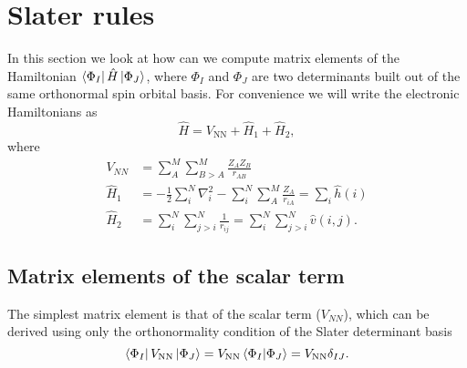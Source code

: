 \documentclass[../Main/chem532-notes.tex]{subfiles}
\begin{document}
\section{Slater rules}
In this section we look at how can we compute matrix elements of the Hamiltonian $\bra{\Phi_I} \hat{H} \ket{\Phi_J}$, where $\Phi_I$ and $\Phi_J$ are two determinants built out of the same orthonormal spin orbital basis. 
For convenience we will write the electronic Hamiltonians as
\begin{equation}
\hat{H} = V_\mathrm{NN} + \hat{H}_1 + \hat{H}_2,
\end{equation}
where
\begin{align}
V_{NN} &= \sum_{A}^{M} \sum_{B > A}^{M} \frac{Z_A Z_B}{r_{AB}}\\
\hat{H}_1 &= -\frac{1}{2} \sum_i^N \nabla^2_i
- \sum_{i}^{N} \sum_{A}^{M} \frac{Z_A}{r_{iA}} = \sum_i \hat{h}(i)\\
\hat{H}_2 &= \sum_{i}^{N}\sum_{j > i}^{N} \frac{1}{r_{ij}} = \sum_{i}^{N}\sum_{j > i}^{N} \hat{v}(i,j).
\end{align}

\subsection{Matrix elements of the scalar term}
The simplest matrix element is that of the scalar term ($V_{NN}$), which can be derived using only the orthonormality condition of the Slater determinant basis
\begin{equation}
\bra{\Phi_I} V_\mathrm{NN} \ket{\Phi_J}
= V_\mathrm{NN} \braket{\Phi_I | \Phi_J} = V_\mathrm{NN} \delta_{IJ}.
\end{equation}
\end{document}
